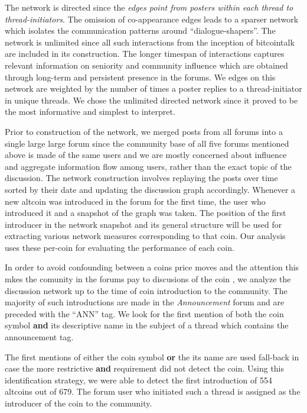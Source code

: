 The network is directed since the \textit{edges point from posters within each thread to thread-initiators}. The omission
of co-appearance edges leads to a sparser network which isolates the communication
patterns around ``dialogue-shapers''. The network is unlimited since all such interactions
from the inception of bitcointalk are included in its construction. The longer timespan
of interactions captures relevant information on seniority and community influence 
which are obtained through long-term and persistent presence in the forums.
We edges on this network are weighted by the number of times a poster replies
to a thread-initiator in unique threads. We chose the unlimited directed network
since it proved to be the most informative and simplest to interpret.

Prior to construction of the network, we merged posts from all forums into a
single large large forum since the community base of all five forums mentioned
above is made of the same users and we are mostly concerned about influence and
aggregate information flow among users, rather than the exact topic of the discussion.
The network construction involves replaying the posts over time sorted by their date and updating the
discussion graph accordingly. Whenever a new altcoin was introduced
in the forum for the first time, the user who introduced it and a snapshot of the graph was taken.
The position of the first introducer in the network snapshot and its general structure 
will be used for extracting various network measures corresponding to that coin. Our analysis
uses these per-coin for evaluating the performance of each coin.


In order to avoid confounding between a coins price moves and the attention this mkes the comunity in the forums pay to discusions of the coin , we analyze the discussion network up to the time of coin introduction to the community.
The  majority of such introductions are made in the \textit{Announcement} forum and are preceded with the ``ANN'' tag.
We look for the first mention of both the coin symbol \textbf{and} its descriptive name in the subject of a thread which contains the announcement tag. 

The first mentions of either the coin symbol \textbf{or} the its name are used fall-back in case the more restrictive \textbf{and} requirement did not detect the coin. 
Using this identification strategy, we were able to detect the first introduction of 554 altcoins out of 679.
The forum user who initiated such a thread is assigned as the  introducer of the coin to the community.
